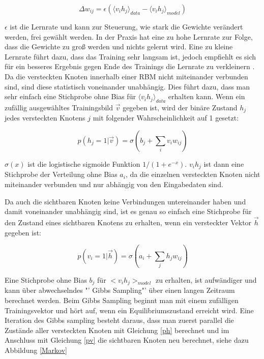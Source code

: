 \documentclass[12pt]{article}
\begin{document}
\begin{equation}
\Delta w_{ij} = \epsilon\left( \langle v_i h_j \rangle_{data} - \langle v_i h_j \rangle_{model} \right)
\end{equation}

$\epsilon$ ist die Lernrate und kann zur Steuerung, wie stark die Gewichte verändert werden, frei gewählt werden. In der Praxis hat eine zu hohe Lernrate zur Folge, dass die Gewichte zu groß werden und nichts gelernt wird. Eine zu kleine Lernrate führt dazu, dass das Training sehr langsam ist, jedoch empfiehlt es sich für ein besseres Ergebnis gegen Ende des Trainings die Lernrate zu verkleinern \cite{Guide}. Da die versteckten Knoten innerhalb einer RBM nicht miteinander verbunden sind, sind diese statistisch voneinander unabhängig. Dies führt dazu, dass man sehr einfach eine Stichprobe ohne Bias für $\langle v_i h_j \rangle_{data}$ erhalten kann. Wenn ein zufällig ausgewähltes Trainingsbild $\vec{v}$ gegeben ist, wird der binäre Zustand $h_j$ jedes versteckten Knotens $j$ mit folgender Wahrscheinlichkeit auf 1 gesetzt:

\begin{equation}
p(h_j = 1 | \vec{v}) = \sigma (b_j + \sum_{i} v_i w_{ij})
\label{ph}
\end{equation}

$\sigma(x)$ ist die logistische sigmoide Funktion $1/(1+e^{-x})$. $v_ih_j$ ist dann eine Stichprobe der Verteilung ohne Bias $a_i$, da die einzelnen versteckten Knoten nicht miteinander verbunden und nur abhängig von den Eingabedaten sind.

Da auch die sichtbaren Knoten keine Verbindungen untereinander haben und damit voneinander unabhängig sind, ist es genau so einfach eine Stichprobe für den Zustand eines sichtbaren Knotens zu erhalten, wenn ein versteckter Vektor $\vec{h}$ gegeben ist:

\begin{equation}
p(v_i =1 | \vec{h}) = \sigma (a_i + \sum_{j} h_j w_{ij})
\label{pv}
\end{equation}

Eine Stichprobe ohne Bias $b_j$ für $<v_i h_j>_{model}$ zu erhalten, ist aufwändiger und kann über abwechselndes "' Gibbs Sampling"' über einen langen Zeitraum berechnet werden. Beim Gibbs Sampling beginnt man mit einem zufälligen Trainingsvektor und hört auf, wenn ein Equilibriumszustand erreicht wird. Eine Iteration des Gibbs sampling besteht daraus, dass man zuerst parallel die Zustände aller versteckten Knoten mit Gleichung \ref{ph} berechnet und im Anschluss mit Gleichung \ref{pv} die sichtbaren Knoten neu berechnet, siehe dazu Abbildung \ref{Markov}
\end{document}
